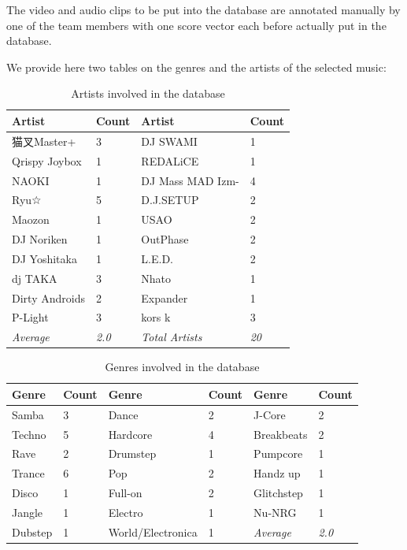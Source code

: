 \documentclass{report}
\begin{document}
The video and audio clips to be put into the database are annotated manually by one of the team members with one score vector each before actually put in the database.

We provide here two tables on the genres and the artists of the selected music:

\begin{table}[H]
\centering

\label{my-label}
\begin{tabular}{llll}
\hline
\textbf{Artist} & \textbf{Count} & \textbf{Artist} & \textbf{Count} \\ \hline
猫叉Master+ & 3 & DJ SWAMI & 1 \\
Qrispy Joybox & 1 & REDALiCE & 1 \\
NAOKI & 1 & DJ Mass MAD Izm- & 4 \\
Ryu☆ & 5 & D.J.SETUP & 2 \\
Maozon & 1 & USAO & 2 \\
DJ Noriken & 1 & OutPhase & 2 \\
DJ Yoshitaka & 1 & L.E.D. & 2 \\
dj TAKA & 3 & Nhato & 1 \\
Dirty Androids & 2 & Expander & 1 \\
P-Light & 3 & kors k & 3 \\ \hline
\textit{Average} & \textit{2.0} & \textit{Total Artists} & \textit{20}
\end{tabular}
\caption{Artists involved in the database}
\end{table}

\begin{table}[H]
\centering
\begin{tabular}{llllll}
\hline
\textbf{Genre} & \textbf{Count} & \textbf{Genre} & \textbf{Count} & \textbf{Genre} & \textbf{Count} \\ \hline
Samba & 3 & Dance & 2 & J-Core & 2 \\
Techno & 5 & Hardcore & 4 & Breakbeats & 2 \\
Rave & 2 & Drumstep & 1 & Pumpcore & 1 \\
Trance & 6 & Pop & 2 & Handz up & 1 \\
Disco & 1 & Full-on & 2 & Glitchstep & 1 \\
Jangle & 1 & Electro & 1 & Nu-NRG & 1 \\ \cline{5-6} 
Dubstep & 1 & World/Electronica & 1 & \textit{Average} & \textit{2.0}
\end{tabular}
\caption{Genres involved in the database}
\end{table}
\end{document}
